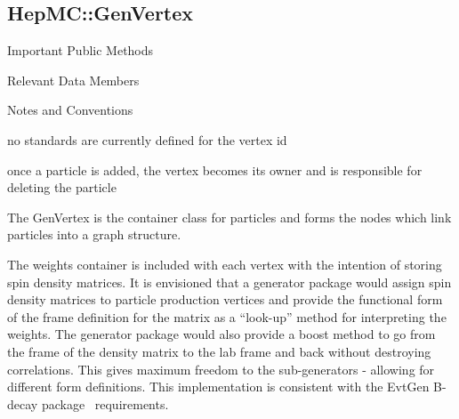 \documentclass[11pt,letterpaper]{article}
\begin{document}
%
%

\subsection{HepMC::GenVertex}
\begin{myitemize}{Important Public Methods}
\end{myitemize}
\begin{myitemize}{Relevant Data Members}
\end{myitemize}
\begin{myitemize}{Notes and Conventions}
  \item no standards are currently defined for the vertex id
  \item once a particle is added, the vertex becomes its owner and is
    responsible for deleting the particle
\end{myitemize}

The GenVertex is the container class for particles and forms the nodes
which link particles into a graph structure.

The weights container is included with each vertex with the intention
of storing spin density matrices. It is envisioned that a
generator package would assign spin density matrices to particle
production vertices and provide the functional form of the frame
definition for the matrix as a ``look-up'' method for interpreting
the weights. The generator package would also provide a boost method
to go from the frame of the density matrix to the lab frame and back
without destroying correlations. This gives maximum freedom to the
sub-generators - allowing for different form definitions.
This implementation is consistent with the EvtGen B-decay
package~\cite{evtgen} requirements. 
\end{document}
